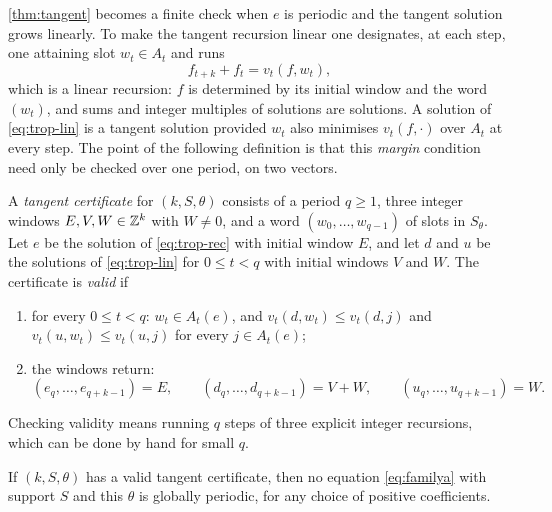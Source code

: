 \autoref{thm:tangent} becomes a finite check when $e$ is periodic and the tangent
solution grows linearly. To make the tangent recursion linear one designates, at
each step, one attaining slot $w_t\in A_t$ and runs
\begin{equation}
f_{t+k}+f_t=v_t(f,w_t),
\label{eq:trop-lin}
\end{equation}
which is a linear recursion: $f$ is determined by its initial window and the word
$(w_t)$, and sums and integer multiples of solutions are solutions. A solution of
\eqref{eq:trop-lin} is a tangent solution provided $w_t$ also minimises $v_t(f,\cdot)$
over $A_t$ at every step. The point of the following definition is that this
\textit{margin} condition need only be checked over one period, on two vectors.

\begin{definition}
\label{def:trop-cert}
A \textit{tangent certificate} for $(k,S,\theta)$ consists of a period $q\ge1$,
three integer windows $E,V,W\in\mathbb{Z}^k$ with $W\ne0$, and a word
$(w_0,\dots,w_{q-1})$ of slots in $S_\theta$. Let $e$ be the solution of
\eqref{eq:trop-rec} with initial window $E$, and let $d$ and $u$ be the solutions of
\eqref{eq:trop-lin} for $0\le t<q$ with initial windows $V$ and $W$. The certificate
is \textit{valid} if
\begin{enumerate}
\item for every $0\le t<q$: $w_t\in A_t(e)$, and
$v_t(d,w_t)\le v_t(d,j)$ and $v_t(u,w_t)\le v_t(u,j)$ for every $j\in A_t(e)$;
\item the windows return:
\[
(e_q,\dots,e_{q+k-1})=E,\qquad
(d_q,\dots,d_{q+k-1})=V+W,\qquad
(u_q,\dots,u_{q+k-1})=W.
\]
\end{enumerate}
\end{definition}

Checking validity means running $q$ steps of three explicit integer recursions,
which can be done by hand for small $q$.

\begin{proposition}
\label{prop:trop-cert}
If $(k,S,\theta)$ has a valid tangent certificate, then no equation
\eqref{eq:familya} with support $S$ and this $\theta$ is globally periodic, for any
choice of positive coefficients.
\end{proposition}

